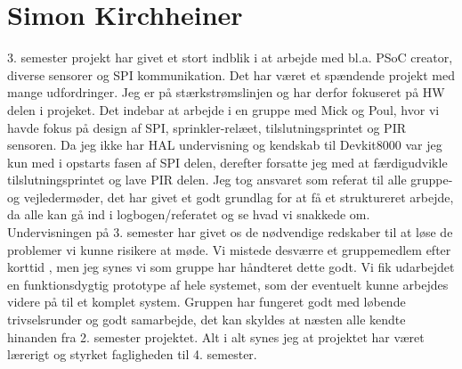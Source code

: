 \section{Simon Kirchheiner}
3. semester projekt har givet et stort indblik i at arbejde med bl.a. PSoC creator, diverse sensorer og SPI kommunikation. Det har været et spændende projekt med mange udfordringer. Jeg er på stærkstrømslinjen og har derfor fokuseret på HW delen i projeket. Det indebar at arbejde i en gruppe med Mick og Poul, hvor vi havde fokus på design af SPI, sprinkler-relæet, tilslutningsprintet og PIR sensoren. Da jeg ikke har HAL undervisning og kendskab til Devkit8000 var jeg kun med i opstarts fasen af SPI delen, derefter forsatte jeg med at færdigudvikle tilslutningsprintet og lave PIR delen.
\newline \newline
Jeg tog ansvaret som referat til alle gruppe- og vejledermøder, det har givet et godt grundlag for at få et struktureret arbejde, da alle kan gå ind i logbogen/referatet og se hvad vi snakkede om. Undervisningen på 3. semester har givet os de nødvendige redskaber til at løse de problemer vi kunne risikere at møde. Vi mistede desværre et gruppemedlem efter korttid , men jeg synes vi som gruppe har håndteret dette godt.
Vi fik udarbejdet en funktionsdygtig prototype af hele systemet, som der eventuelt kunne arbejdes videre på til et komplet system. Gruppen har fungeret godt med løbende trivselsrunder og godt samarbejde, det kan skyldes at næsten alle kendte hinanden fra 2. semester projektet. Alt i alt synes jeg at projektet har været lærerigt og styrket fagligheden til 4. semester. 